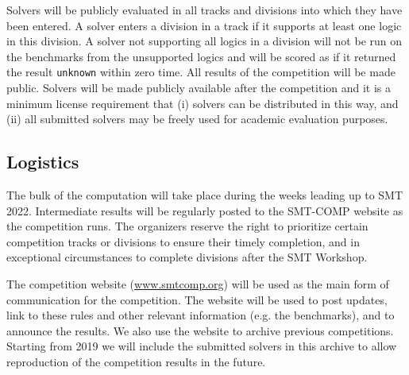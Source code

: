 \documentclass[12pt]{article}
\newcommand{\rem}[1]{\textcolor{red}{[#1]}}
\newcommand{\an}[1]{\rem{#1 -- aina}}
\begin{document}
Solvers will be publicly evaluated in all tracks and divisions into
which they have been entered.
%
A solver enters a division in a track if it supports at least one
logic in this division.
%
A solver not supporting all logics in a division will not be run on
the benchmarks from the unsupported logics and will be scored as if it
returned the result \texttt{unknown} within zero time.
%
All results of the competition will be made public. Solvers will be
made publicly available after the competition and it is a minimum
license requirement that (i) solvers can be distributed in this way,
and (ii) all submitted solvers may be freely used for academic
evaluation purposes.



\subsection{Logistics}
\label{sec:logistics}

%
The bulk of the computation will take place during the weeks leading
up to SMT 2022.  Intermediate results will be regularly posted to the
SMT-COMP website as the competition runs.
%
The organizers reserve the right to prioritize certain competition
tracks or divisions to ensure their timely completion, and in
exceptional circumstances to complete divisions after the SMT
Workshop.


The competition website (\url{www.smtcomp.org}) will be used as the main form
of communication for the competition. The website will be used to post updates,
link to these rules and other relevant information (e.g. the benchmarks), and
to announce the results. We also use the website to archive previous
competitions. Starting from 2019 we will include the submitted solvers in this
archive to allow reproduction of the competition results in the future.
%
\end{document}
